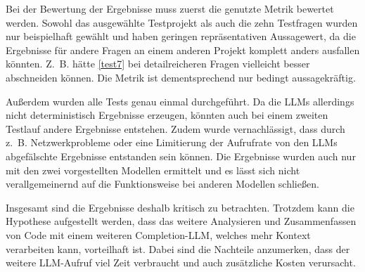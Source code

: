 \documentclass[../main.tex]{subfiles}
\begin{document}
Bei der Bewertung der Ergebnisse muss zuerst die genutzte Metrik bewertet werden.
Sowohl das ausgewählte Testprojekt als auch die zehn Testfragen wurden nur beispielhaft gewählt und haben geringen repräsentativen Aussagewert, da die Ergebnisse für andere Fragen an einem anderen Projekt komplett anders ausfallen könnten.
Z. B. hätte \ref{test7} bei detailreicheren Fragen vielleicht besser abschneiden können.
Die Metrik ist dementsprechend nur bedingt aussagekräftig.

Außerdem wurden alle Tests genau einmal durchgeführt. 
Da die \glspl{LLM} allerdings nicht deterministisch Ergebnisse erzeugen, könnten auch bei einem zweiten Testlauf andere Ergebnisse entstehen.
Zudem wurde vernachlässigt, dass durch z. B.  Netzwerkprobleme oder eine Limitierung der Aufrufrate von den \glspl{LLM} abgefälschte Ergebnisse entstanden sein können.
Die Ergebnisse wurden auch nur mit den zwei vorgestellten Modellen ermittelt und es lässt sich nicht verallgemeinernd auf die Funktionsweise bei anderen Modellen schließen.

Insgesamt sind die Ergebnisse deshalb kritisch zu betrachten.
Trotzdem kann die Hypothese aufgestellt werden, dass das weitere Analysieren und Zusammenfassen von Code mit einem weiteren Completion-\gls{LLM}, welches mehr Kontext verarbeiten kann, vorteilhaft ist.
Dabei sind die Nachteile anzumerken, dass der weitere \gls{LLM}-Aufruf viel Zeit verbraucht und auch zusätzliche Kosten verursacht. 
\end{document}
